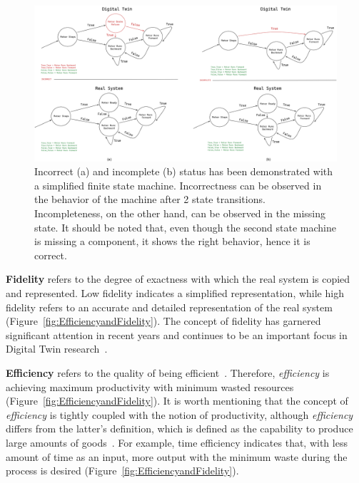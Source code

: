 \documentclass{llncs}
\begin{document}
    \begin{figure}
        
        \centering
            \includegraphics[width = 1\textwidth]{Correctness and Completeness.png}
            \caption{Incorrect  (a) and incomplete (b) status has been demonstrated with a 
            simplified finite state machine. Incorrectness can be observed in the behavior 
            of the machine after 2 state transitions. Incompleteness, on the other hand, can be observed in 
            the missing state. It should be noted that, even though the second state machine is missing a 
            component, it shows the right behavior, hence it is correct. }\label{fig:CorrectnessAndCompleteness}
    \end{figure}

    \textbf{Fidelity} refers to the degree of exactness with which the real system is copied and represented. 
    Low fidelity indicates a simplified representation, 
    while high fidelity refers to an accurate and detailed representation of the real system~\cite{Review2} (Figure~\ref{fig:EfficiencyandFidelity}). 
    The concept of fidelity has garnered significant attention in recent
    years and continues to be an important focus in Digital Twin research~\cite{Review2,Review1}.

    \textbf{Efficiency} refers to the quality of being efficient~\cite{OxfordDictionary}. 
    Therefore, \textit{efficiency} is achieving maximum productivity with minimum wasted resources (Figure~\ref{fig:EfficiencyandFidelity}). 
    It is worth mentioning that the concept of \textit{efficiency} is tightly coupled with the notion of productivity, 
    although \textit{efficiency} differs from the latter's definition, which is defined as the capability to produce large amounts of goods~\cite{OxfordDictionary}.  
    For example, time efficiency indicates that,  with less amount of time as an input, more output with the minimum waste during the process is desired (Figure~\ref{fig:EfficiencyandFidelity}).
    
\end{document}
